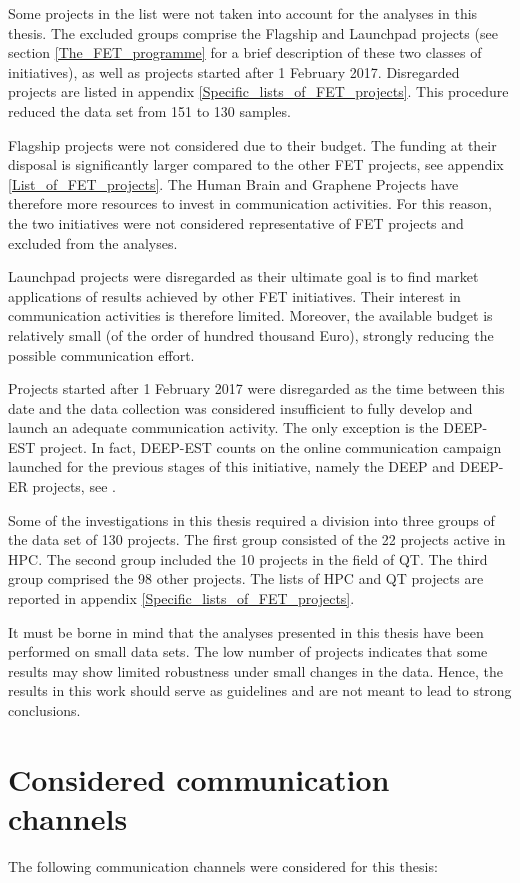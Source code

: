 Some projects in the list were not taken into account for the analyses in this thesis. The excluded groups comprise the Flagship and Launchpad projects (see section \ref{The_FET_programme} for a brief description of these two classes of initiatives), as well as projects started after 1 February 2017. Disregarded projects are listed in appendix \ref{Specific_lists_of_FET_projects}. This procedure reduced the data set from 151 to 130 samples.

Flagship projects were not considered due to their budget. The funding at their disposal is significantly larger compared to the other FET projects, see appendix \ref{List_of_FET_projects}. The Human Brain and Graphene Projects have therefore more resources to invest in communication activities. For this reason, the two initiatives were not considered representative of FET projects and excluded from the analyses. 

Launchpad projects were disregarded as their ultimate goal is to find market applications of results achieved by other FET initiatives. Their interest in communication activities is therefore limited. Moreover, the available budget is relatively small (of the order of hundred thousand Euro), strongly reducing the possible communication effort. 

Projects started after 1 February 2017 were disregarded as the time between this date and the data collection was considered insufficient to fully develop and launch an adequate communication activity. The only exception is the DEEP-EST project. In fact, DEEP-EST counts on the online communication campaign launched for the previous stages of this initiative, namely the DEEP and DEEP-ER projects, see \cite{DEEPprojects}.   

Some of the investigations in this thesis required a division into three groups of the data set of 130 projects. The first group consisted of the 22 projects active in HPC. The second group included the 10 projects in the field of QT. The third group comprised the 98 other projects. The lists of HPC and QT projects are reported in appendix \ref{Specific_lists_of_FET_projects}.

It must be borne in mind that the analyses presented in this thesis have been performed on small data sets. The low number of projects indicates that some results may show limited robustness under small changes in the data. Hence, the results in this work should serve as guidelines and are not meant to lead to strong conclusions.  

\section{Considered communication channels} \label{Considered_channels}
The following communication channels were considered for this thesis:   

